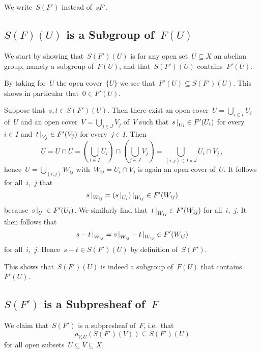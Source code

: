 \section{}

We write~$S(F')$ instead of~$sF'$.





\subsection*{$S(F)(U)$ is a Subgroup of~$F(U)$}

We start by showing that~$S(F')(U)$ is for any open set~$U \subseteq X$ an abelian group, namely a subgroup of~$F(U)$, and that~$S(F')(U)$ contains~$F'(U)$.

By taking for~$U$ the open cover~$\{U\}$ we see that~$F'(U) \subseteq S(F')(U)$.
This shows in particular that~$0 \in F'(U)$.

Suppose that~$s, t \in S(F')(U)$.
Then there exist an open cover~$U = \bigcup_{i \in I} U_i$ of~$U$ and an open cover~$V = \bigcup_{j \in J} V_j$ of~$V$ such that~$\restrict{s}{U_i} \in F'(U_i)$ for every~$i \in I$ and~$\restrict{t}{V_j} \in F'(V_j)$ for every~$j \in I$.
Then
\[
    U
  = U \cap U
  = \left( \bigcup_{i \in I} U_i \right) \cap \left( \bigcup_{j \in J} V_j \right)
  = \bigcup_{(i,j) \in I \times J} U_i \cap V_j \,,
\]
hence~$U = \bigcup_{(i,j)} W_{ij}$ with~$W_{ij} = U_i \cap V_j$ is again an open cover of~$U$.
It follows for all~$i$,~$j$ that
\[
      \restrict{s}{W_{ij}}
  =   \restrict{(\restrict{s}{U_i})}{W_{ij}}
  \in F'(W_{ij})
\]
because~$\restrict{s}{U_i} \in F'(U_i)$.
We similarly find that~$\restrict{t}{W_{ij}} \in F'(W_{ij})$ for all~$i$,~$j$.
It then follows that
\[
      \restrict{s - t}{W_{ij}}
  =   \restrict{s}{W_{ij}} - \restrict{t}{W_{ij}}
  \in F'(W_{ij})
\]
for all~$i$,~$j$.
Hence~$s - t \in S(F')(U)$ by definition of~$S(F')$.

This shows that~$S(F')(U)$ is indeed a subgroup of~$F(U)$ that contains~$F'(U)$.





\subsection*{$S(F')$ is a Subpresheaf of~$F$}

We claim that~$S(F')$ is a subpresheaf of~$F$, i.e.\ that
\[
            \rho_{V,U}(S(F')(V))
  \subseteq S(F')(U)
\]
for all open subsets~$U \subseteq V \subseteq X$.

